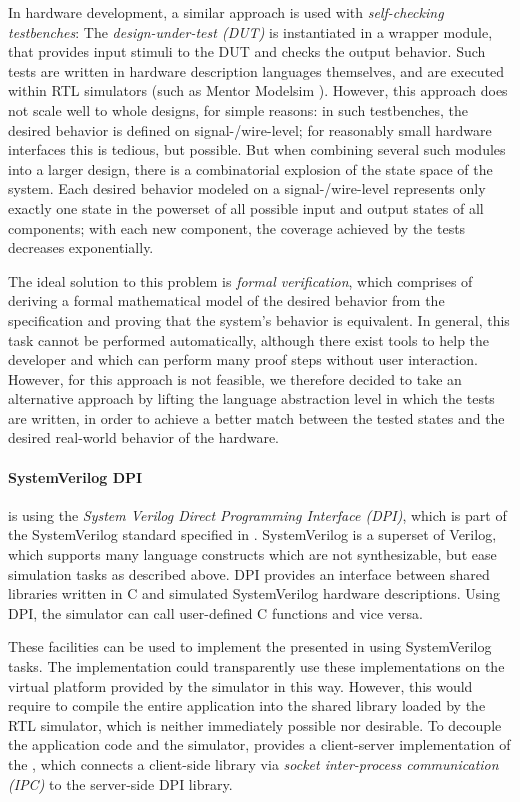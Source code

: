 \medskip
In hardware development, a similar approach is used with \emph{self-checking testbenches}:
The \emph{design-under-test (DUT)} is instantiated in a wrapper module, that provides input stimuli to the DUT and checks the output behavior.
Such tests are written in hardware description languages themselves, and are executed within RTL simulators (such as Mentor Modelsim \cite{modelsim}).
However, this approach does not scale well to whole designs, for simple reasons:
in such testbenches, the desired behavior is defined on signal-/wire-level; for reasonably small hardware interfaces this is tedious, but possible.
But when combining several such modules into a larger design, there is a combinatorial explosion of the state space of the system.
Each desired behavior modeled on a signal-/wire-level represents only exactly one state in the powerset of all possible input and output states of all components; with each new component, the coverage achieved by the tests decreases exponentially.

\medskip
The ideal solution to this problem is \emph{formal verification}, which comprises of deriving a formal mathematical model of the desired behavior from the specification and proving that the system's behavior is equivalent.
In general, this task cannot be performed automatically, although there exist tools to help the developer and which can perform many proof steps without user interaction.
However, for \tpc{} this approach is not feasible, we therefore decided to take an alternative approach by lifting the language abstraction level in which the tests are written, in order to achieve a better match between the tested states and the desired real-world behavior of the hardware.

\medskip
\paragraph{SystemVerilog DPI}
\tpc{} is using the \emph{System Verilog Direct Programming Interface (DPI)}, which is part of the SystemVerilog standard specified in \cite{sv-spec}.
SystemVerilog is a superset of Verilog, which supports many language constructs which are not synthesizable, but ease simulation tasks as described above.
DPI provides an interface between shared libraries written in C and simulated SystemVerilog hardware descriptions.
Using DPI, the simulator can call user-defined C functions and vice versa.

\medskip
These facilities can be used to implement the  presented in  using SystemVerilog tasks.
The  implementation could transparently use these implementations on the virtual platform provided by the simulator in this way.
However, this would require to compile the entire application into the shared library loaded by the RTL simulator, which is neither immediately possible nor desirable.
To decouple the application code and the simulator, \tpc{} provides a client-server implementation of the , which connects a client-side library via \emph{socket inter-process communication (IPC)} to the server-side DPI library.

